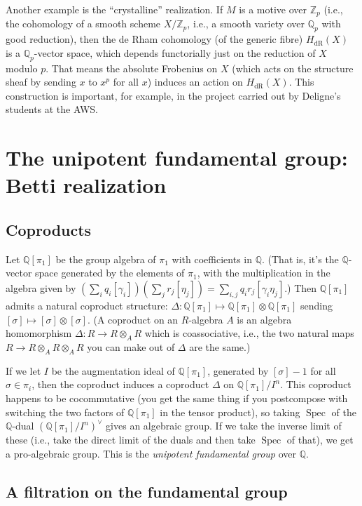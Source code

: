 \documentclass[12pt]{article}
\def\QQ{\mathbb{Q}}
\def\ZZ{\mathbb{Z}}
\def\dual{\vee}
\DeclareMathOperator{\dR}{dR}
\DeclareMathOperator{\Spec}{Spec}
\begin{document}
Another example is the ``crystalline'' realization.
If $M$ is a motive over $\ZZ_p$ (i.e., the cohomology of a smooth scheme
$X/\ZZ_p$, i.e., a smooth variety over $\QQ_p$ with good reduction), then
the de Rham cohomology (of the generic fibre)
$H_{\dR}(X)$ is a $\QQ_p$-vector space, which
depends functorially just on the reduction of $X$ modulo $p$. That means
the absolute Frobenius on $X$ (which acts on the structure sheaf by
sending $x$ to $x^p$ for all $x$) induces an action on $H_{\dR}(X)$.
This construction is important, for example, in the project carried out
by Deligne's students at the AWS.

\section{The unipotent fundamental group: Betti realization}

\subsection*{Coproducts}

Let $\QQ[\pi_1]$ be the group algebra of $\pi_1$ with coefficients in
$\QQ$. (That is, it's the $\QQ$-vector space generated by the elements of
$\pi_1$, with the multiplication in the algebra given by
$(\sum_i q_i [\gamma_i])(\sum_j r_j [\eta_j]) =
\sum_{i,j} q_i r_j [\gamma_i \eta_j]$.)
Then $\QQ[\pi_1]$ admits a natural coproduct structure:
$\Delta: \QQ[\pi_1] \mapsto \QQ[\pi_1] \otimes \QQ[\pi_1]$ sending
$[\sigma] \mapsto [\sigma] \otimes [\sigma]$. (A coproduct on an $R$-algebra
$A$ is an algebra homomorphism $\Delta: R \to R \otimes_A R$ which
is coassociative, i.e., the two natural maps $R \to R \otimes_A R \otimes_A R$
you can make out of $\Delta$ are the same.)

If we let $I$ be the augmentation ideal of $\QQ[\pi_1]$,
generated by $[\sigma] - 1$ for all $\sigma \in \pi_i$, then
the coproduct induces a coproduct $\Delta$ on $\QQ[\pi_1]/I^n$.
This coproduct happens to be cocommutative (you get the same thing if you
postcompose with switching the two factors of $\QQ[\pi_1]$ in the tensor
product), so taking $\Spec$ of
the $\QQ$-dual $(\QQ[\pi_1]/I^n)^\dual$ gives an algebraic group. If
we take the inverse limit of these (i.e., take the direct limit of the duals
and then take $\Spec$ of that), we get a pro-algebraic group.
This is the \emph{unipotent fundamental group} over $\QQ$.

\subsection*{A filtration on the fundamental group}
\end{document}
